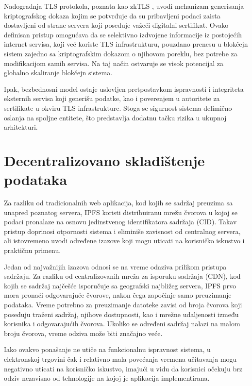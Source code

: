 Nadogradnja TLS protokola, poznata kao zkTLS \cite{kireieva2024zktls}, uvodi mehanizam generisanja kriptografskog dokaza kojim se potvrđuje da su pribavljeni podaci zaista dostavljeni od strane servera koji poseduje važeći digitalni sertifikat. Ovako definisan pristup omogućava da se selektivno izdvojene informacije iz postojećih internet servisa, koji već koriste TLS infrastrukturu, pouzdano prenesu u blokčejn sistem zajedno sa kriptografskim dokazom o njihovom poreklu, bez potrebe za modifikacijom samih servisa. Na taj način ostvaruje se visok potencijal za globalno skaliranje blokčejn sistema.

Ipak, bezbednosni model ostaje uslovljen pretpostavkom ispravnosti i integriteta eksternih servisa koji generišu podatke, kao i poverenjem u autoritete za sertifikate u okviru TLS infrastrukture. Stoga se sigurnost sistema delimično oslanja na spoljne entitete, što predstavlja dodatnu tačku rizika u ukupnoj arhitekturi.

\section{Decentralizovano skladištenje podataka}
Za razliku od tradicionalnih web aplikacija, kod kojih se sadržaj preuzima sa unapred poznatog servera, IPFS koristi distribuiranu mrežu čvorova u kojoj se podaci pronalaze na osnovu jedinstvenog identifikatora sadržaja (CID). Takav pristup doprinosi otpornosti sistema i eliminiše zavisnost od centralnog servera, ali istovremeno uvodi određene izazove koji mogu uticati na korisničko iskustvo i praktičnu primenu.

Jedan od najvažnijih izazova odnosi se na vreme odaziva prilikom pristupa sadržaju. Za razliku od centralizovanih mreža za isporuku sadržaja (CDN), kod kojih se sadržaj najčešće isporučuje sa geografski najbližeg servera, IPFS prvo mora pronaći odgovarajuće čvorove, nakon čega započinje samo preuzimanje podataka. Vreme potrebno za preuzimanje datoteke zavisi od broja čvorova koji poseduju traženi sadržaj, njihove dostupnosti, kao i mrežne udaljenosti između korisnika i odgovarajućih čvorova. Ukoliko se određeni sadržaj nalazi na malom broju čvorova, vreme odziva može biti značajno veće.

Iako ovakvo ponašanje ne utiče na funkcionalnu ispravnost sistema, u elektronskoj trgovini čak i relativno mala povećanja vremena učitavanja mogu negativno uticati na korisničko iskustvo, imajući u vidu da korisnici očekuju brz odziv nezavisno od tehnologije na kojoj je aplikacija implementirana.

